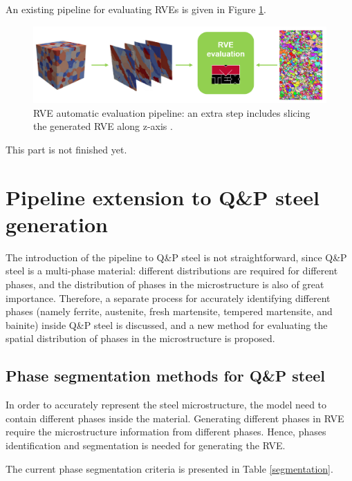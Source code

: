 An existing pipeline for evaluating RVEs is given in Figure \ref{fig:evaluate}.

\begin{figure}[h!]
    \captionsetup{justification=centering,margin=1cm}
    \centering
    \includegraphics[width=1.0\textwidth]{Image/evaluation.png}
    \caption{RVE automatic evaluation pipeline: an extra step includes slicing the generated RVE along z-axis \cite{Azhari2022}.}
    \label{fig:evaluate}
\end{figure}

This part is not finished yet.

\section{Pipeline extension to Q\&P steel generation}
The introduction of the pipeline to Q\&P steel is not straightforward, since Q\&P steel is a multi-phase material: different distributions are required for different phases, and the distribution of phases in the microstructure is also of great importance. Therefore, a separate process for accurately identifying different phases (namely ferrite, austenite, fresh martensite, tempered martensite, and bainite) inside Q\&P steel is discussed, and a new method for evaluating the spatial distribution of phases in the microstructure is proposed.
\\
\subsection{Phase segmentation methods for Q\&P steel}
In order to accurately represent the steel microstructure, the model need to contain different phases inside the material. Generating different phases in RVE require the microstructure information from different phases. Hence, phases identification and segmentation is needed for generating the RVE. 

The current phase segmentation criteria is presented in Table \ref{segmentation}. 

